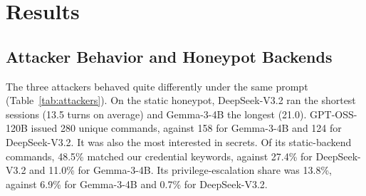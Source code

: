 \documentclass[runningheads]{llncs}
\begin{document}
\section{Results}\label{sec:results}

\subsection{Attacker Behavior and Honeypot Backends}\label{sec:behavior}

The three attackers behaved quite differently under the same prompt (Table~\ref{tab:attackers}). On the static honeypot, DeepSeek-V3.2 ran the shortest sessions (13.5 turns on average) and Gemma-3-4B the longest (21.0). GPT-OSS-120B issued 280 unique commands, against 158 for Gemma-3-4B and 124 for DeepSeek-V3.2. It was also the most interested in secrets. Of its static-backend commands, 48.5\% matched our credential keywords, against 27.4\% for DeepSeek-V3.2 and 11.0\% for Gemma-3-4B. Its privilege-escalation share was 13.8\%, against 6.9\% for Gemma-3-4B and 0.7\% for DeepSeek-V3.2.
\end{document}
